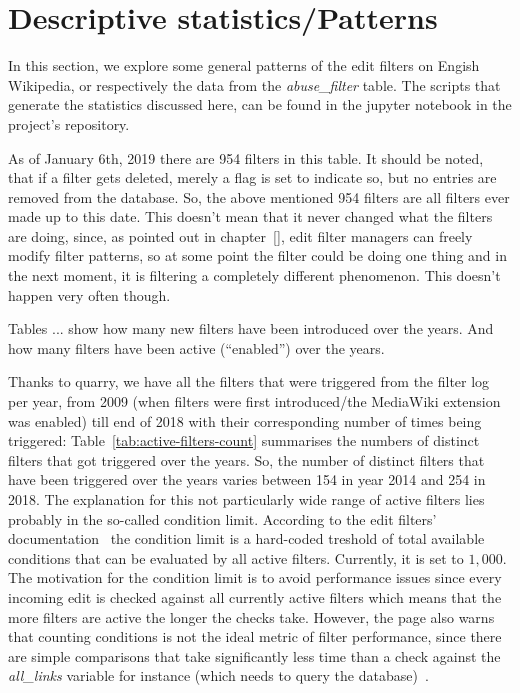 \section{Descriptive statistics/Patterns}
\label{sec:patterns}

In this section, we explore some general patterns of the edit filters on Engish Wikipedia, or respectively the data from the \emph{abuse\_filter} table.
The scripts that generate the statistics discussed here, can be found in the jupyter notebook in the project's repository. %

As of January 6th, 2019 there are 954 filters in this table.
It should be noted, that if a filter gets deleted, merely a flag is set to indicate so, but no entries are removed from the database.
So, the above mentioned 954 filters are all filters ever made up to this date.
This doesn't mean that it never changed what the filters are doing, since, as pointed out in chapter~\ref{}, edit filter managers can freely modify filter patterns, so at some point the filter could be doing one thing and in the next moment, it is filtering a completely different phenomenon.
This doesn't happen very often though.

Tables ... show how many new filters have been introduced over the years.
And how many filters have been active (``enabled'') over the years. %

Thanks to quarry, we have all the filters that were triggered from the filter log per year, from 2009 (when filters were first introduced/the MediaWiki extension was enabled) till end of 2018 with their corresponding number of times being triggered:
Table~\ref{tab:active-filters-count} summarises the numbers of distinct filters that got triggered over the years.
So, the number of distinct filters that have been triggered over the years varies between 154 in year 2014 and 254 in 2018.
The explanation for this not particularly wide range of active filters lies probably in the so-called condition limit.
According to the edit filters' documentation~\cite{Wikipedia:EditFilterDocumentation} the condition limit is a hard-coded treshold of total available conditions that can be evaluated by all active filters.
Currently, it is set to $1,000$.
The motivation for the condition limit is to avoid performance issues since every incoming edit is checked against all currently active filters which means that the more filters are active the longer the checks take.
However, the page also warns that counting conditions is not the ideal metric of filter performance, since there are simple comparisons that take significantly less time than a check against the \emph{all\_links} variable for instance (which needs to query the database)~\cite{Wikipedia:EditFilterDocumentation}.

